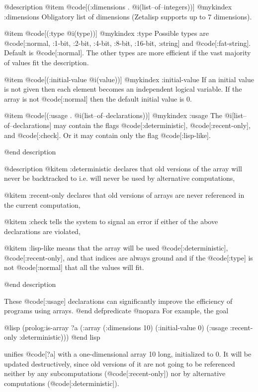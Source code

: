 {@description
@item @code[(:dimensions . @i(list--of--integers))]
@mykindex :dimensions
Obligatory list of dimensions (Zetalisp supports up to 7 dimensions).

@item @code[(:type @i(type))]
@mykindex :type
Possible types are
@code[:normal, :1-bit, :2-bit, :4-bit, :8-bit, :16-bit, :string]
and @code[:fat-string].
Default is @code[:normal].
The other types are more efficient if the vast majority of values fit the
description.

@item @code[(:initial-value @i(value))]
@mykindex :initial-value
If an initial value is not given then each element becomes an independent
logical variable.
If the array is not @code[:normal] then the default initial value is 0.

@item @code[(:usage . @i(list--of--declarations))]
@mykindex :usage
The @i[list--of--declarations] may contain the flags 
@code[:deterministic], @code[:recent-only], and @code[:check].  
Or it may contain only the flag @code[:lisp-like].

@end description

@description
@kitem :deterministic
declares that old versions of the array
will never be backtracked to i.e. will never be used by alternative
computations,

@kitem :recent-only
declares that old versions of arrays are never 
referenced in the current computation,

@kitem :check
tells the system to signal an error if either of the above 
declarations are violated,

@kitem :lisp-like
means that the array will be used 
@code[:deterministic], @code[:recent-only],
and that indices are always ground and if the @code[:type] is not 
@code[:normal] that all the values will fit.

@end description

These @code[:usage] declarations can significantly improve the efficiency of 
programs using arrays.
@end defpredicate
@nopara
For example, the goal

@lisp
(prolog:is-array ?a 
  (:array (:dimensions 10) 
          (:initial-value 0)
          (:usage :recent-only :deterministic)))
@end lisp

unifies @code[?a] with a one-dimensional array 10 long, initialized to
0. It will be updated destructively, since old versions of it
are not going to be referenced neither by any subcomputations 
(@code[:recent-only]) nor by alternative computations (@code[:deterministic]).

}

